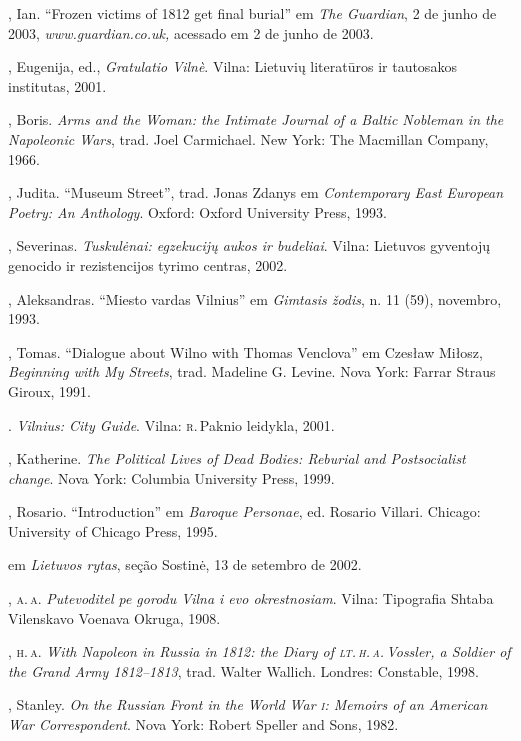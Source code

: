 \begin{bibliohedra}
  , Ian. ``Frozen victims of 1812 get final burial'' em \textit{The
  Guardian}, 2 de junho de 2003, \textit{www.guardian.co.uk,} acessado em
  2 de junho de 2003.

  , Eugenija, ed., \textit{Gratulatio Vilnè}. Vilna: Lietuvių
  literatūros ir tautosakos institutas, 2001.

  , Boris. \textit{Arms and the Woman: the Intimate Journal of a
  Baltic Nobleman in the Napoleonic Wars}, trad. Joel Carmichael. New
  York: The Macmillan Company, 1966.

  , Judita. ``Museum Street'', trad. Jonas Zdanys em
  \textit{Contemporary East European Poetry: An Anthology}. Oxford: Oxford University Press, 1993.

  , Severinas. \textit{Tuskulėnai: egzekucijų aukos ir budeliai}.
  Vilna: Lietuvos gyventojų genocido ir rezistencijos tyrimo centras,
  2002.


, Aleksandras. ``Miesto vardas Vilnius'' em \textit{Gimtasis
žodis}, n. 11 (59), novembro, 1993.

, Tomas. ``Dialogue about Wilno with Thomas Venclova'' em
Czesław Miłosz, \textit{Beginning with My Streets}, trad. Madeline G.
Levine. Nova York: Farrar Straus Giroux, 1991.

\titidem. \textit{Vilnius: City Guide}. Vilna: \textsc{r}.\,Paknio
leidykla, 2001.

, Katherine. \textit{The Political Lives of Dead Bodies: Reburial
and Postsocialist change}. Nova York: Columbia University Press, 1999.

, Rosario. ``Introduction'' em \textit{Baroque Personae}, ed.
Rosario Villari. Chicago: University of Chicago Press, 1995.

 em \textit{Lietuvos rytas}, seção
Sostinė, 13 de setembro de 2002.

, \textsc{a.\,a.} \textit{Putevoditel pe gorodu Vilna i evo okrestnosiam}.
Vilna: Tipografia Shtaba Vilenskavo Voenava Okruga, 1908.

, \textsc{h.\,a}. \textit{With Napoleon in Russia in 1812: the Diary of \textsc{lt.\,h.\,a.}\,Vossler, a Soldier of the Grand Army 1812--1813}, trad. Walter
Wallich. Londres: Constable, 1998.

, Stanley. \textit{On the Russian Front in the World War \textsc{i}:
Memoirs of an American War Correspondent}. Nova York: Robert Speller and
Sons, 1982.


\end{bibliohedra}
